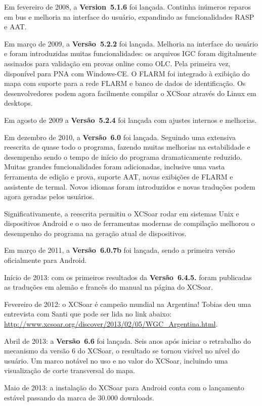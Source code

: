 Em fevereiro de 2008, a {\bf Version~5.1.6} foi lançada.  Continha inúmeros reparos em bus e melhoria na interface do usuário, expandindo as funcionalidades RASP e AAT. 

Em março de 2009, a {\bf Versão~5.2.2} foi lançada.  Melhoria na interface do usuário e foram introduzidas muitas funcionalidades: os arquivos IGC foram digitalmente assinados para validação em provas online como OLC.  Pela primeira vez, disponível para PNA com Windows-CE.  O FLARM foi integrado à exibição do mapa com suporte para a rede FLARM e banco de dados de identificação.  Os desenvolvedores podem agora facilmente compilar o XCSoar através do Linux em desktops. 

Em agosto de 2009 a {\bf Versão~5.2.4} foi lançada com ajustes internos e melhorias.

Em dezembro de 2010, a {\bf Versão~6.0} foi lançada.  Seguindo uma extensiva reescrita de quase todo o programa, fazendo muitas melhorias na estabilidade e desempenho sendo o tempo de início do programa dramaticamente reduzido.  Muitas grandes funcionalidades foram adicionadas, inclusive uma vasta ferramenta de edição e prova, suporte AAT, novas exibições de FLARM e assistente de termal.   Novos idiomas foram introduzidos e novas traduções podem agora geradas pelos usuários.

Significativamente, a reescrita permitiu o XCSoar rodar em sistemas Unix e dispositivos Android e o uso de ferramentas modernas de compilação melhorou o desempenho do programa na geração atual de dispositivos.

Em março de 2011, a {\bf Versão~6.0.7b} foi lançada, sendo a primeira versão oficialmente para Android.

Início de 2013: com os primeiros resultados da {\bf Versão~6.4.5.} foram publicadas as traduções em alemão e francês do manual na página do XCSoar.

Fevereiro de 2012: o XCSoar é campeão mundial na Argentina!  Tobias deu uma entrevista com Santi que pode ser lida no link abaixo:
\url{http://www.xcsoar.org/discover/2013/02/05/WGC_Argentina.html}.

Abril de 2013: a {\bf Versão~6.6} foi lançada.  Seis anos após iniciar o retrabalho do mecanismo da versão 6  do XCSoar, o resultado se tornou visível no nível do usuário.  Um marco notável no uso e no valor do XCSoar, incluindo uma visualização de corte transversal do mapa.

Maio de 2013: a instalação do XCSoar para Android conta com o lançamento estável passando da marca de 30.000 downloads.

